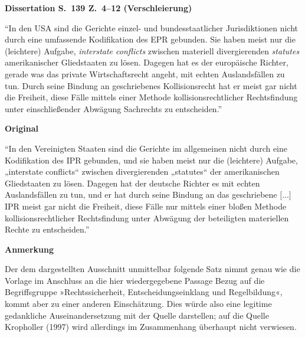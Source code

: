 \documentclass[ngerman,final,fontsize=12pt,paper=a4,twoside,bibliography=totocnumbered,BCOR=8mm,draft=false]{scrartcl}
\newenvironment{fragment}
	{\begin{snugshade}}
	{\end{snugshade}
	 \penalty-200
	 \vskip 0pt plus 10mm minus 5mm}
\newenvironment{fragmentpart}[1]
	{\noindent\textbf{#1}\par\penalty500}
	{\par}
\begin{document}
\hypertarget{Lm-Fragment-139-04}{}
\begin{fragment}
\begin{fragmentpart}{Dissertation S.~139 Z.~4--12 (Verschleierung)}
\enquote{In den USA sind die Gerichte einzel- und bundesstaatlicher Jurisdiktionen nicht durch eine umfassende Kodifikation des EPR gebunden. Sie haben meist nur die (leichtere) Aufgabe, \textsl{interstate conflicts} zwischen materiell divergierenden \textsl{statutes} amerikanischer Gliedstaaten zu lösen. Dagegen hat es der europäische Richter, gerade was das private Wirtschaftsrecht angeht, mit echten Auslandsfällen zu tun. Durch seine Bindung an geschriebenes Kollisionsrecht hat er meist gar nicht die Freiheit, diese Fälle mittels einer Methode kollisionsrechtlicher Rechtsfindung unter einschließender Abwägung Sachrechts zu entscheiden.}
\end{fragmentpart}
\begin{fragmentpart}{Original \cite[S.~80 Z.~7--12,~13--15]{Kropholler-1997}}
\enquote{In den Vereinigten Staaten sind die Gerichte im allgemeinen nicht durch eine Kodifikation des IPR gebunden, und sie haben meist nur die (leichtere) Aufgabe, „interstate conflicts“ zwischen divergierenden „statutes“ der amerikanischen Gliedstaaten zu lösen. Dagegen hat der deutsche Richter es mit echten Auslandsfällen zu tun, und er hat durch seine Bindung an das geschriebene $[$...$]$ IPR meist gar nicht die Freiheit, diese Fälle nur mittels einer bloßen Methode kollisionsrechtlicher Rechtsfindung unter Abwägung der beteiligten materiellen Rechte zu entscheiden.}
\end{fragmentpart}
\begin{fragmentpart}{Anmerkung}
Der dem dargestellten Ausschnitt unmittelbar folgende Satz nimmt genau wie die Vorlage im Anschluss an die hier wiedergegebene Passage Bezug auf die Begriffsgruppe »Rechtssicherheit, Entscheidungseinklang und Regelbildung«, kommt aber zu einer anderen Einschätzung. Dies würde also eine legitime gedankliche Auseinandersetzung mit der Quelle darstellen; auf die Quelle Kropholler (1997) wird allerdings im Zusammenhang überhaupt nicht verwiesen.
\end{fragmentpart}
\end{fragment}
\hypertarget{Lm-Fragment-143-10}{}
\end{document}
